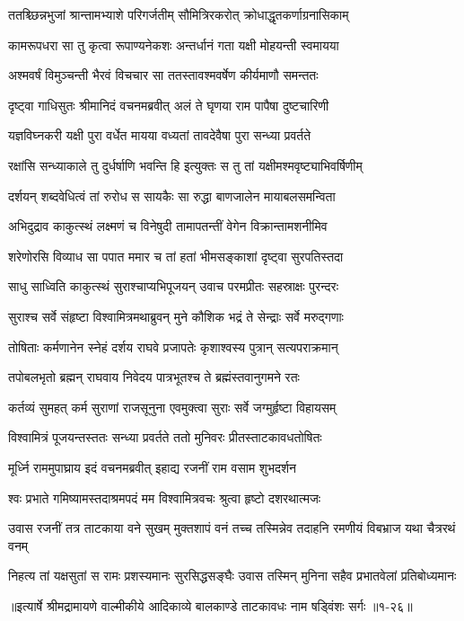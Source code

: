\twolineshloka
{ततश्च्छिन्नभुजां श्रान्तामभ्याशे परिगर्जतीम्}
{सौमित्रिरकरोत् क्रोधाद्धृतकर्णाग्रनासिकाम्} %

\twolineshloka
{कामरूपधरा सा तु कृत्वा रूपाण्यनेकशः}
{अन्तर्धानं गता यक्षी मोहयन्ती स्वमायया} %

\twolineshloka
{अश्मवर्षं विमुञ्चन्ती भैरवं विचचार सा}
{ततस्तावश्मवर्षेण कीर्यमाणौ समन्ततः} %

\twolineshloka
{दृष्ट्वा गाधिसुतः श्रीमानिदं वचनमब्रवीत्}
{अलं ते घृणया राम पापैषा दुष्टचारिणी} %

\twolineshloka
{यज्ञविघ्नकरी यक्षी पुरा वर्धेत मायया}
{वध्यतां तावदेवैषा पुरा सन्ध्या प्रवर्तते} %

\twolineshloka
{रक्षांसि सन्ध्याकाले तु दुर्धर्षाणि भवन्ति हि}
{इत्युक्तः स तु तां यक्षीमश्मवृष्ट्याभिवर्षिणीम्} %

\twolineshloka
{दर्शयन् शब्दवेधित्वं तां रुरोध स सायकैः}
{सा रुद्धा बाणजालेन मायाबलसमन्विता} %

\twolineshloka
{अभिदुद्राव काकुत्स्थं लक्ष्मणं च विनेषुदी}
{तामापतन्तीं वेगेन विक्रान्तामशनीमिव} %

\twolineshloka
{शरेणोरसि विव्याध सा पपात ममार च}
{तां हतां भीमसङ्काशां दृष्ट्वा सुरपतिस्तदा} %

\twolineshloka
{साधु साध्विति काकुत्स्थं सुराश्चाप्यभिपूजयन्}
{उवाच परमप्रीतः सहस्राक्षः पुरन्दरः} %

\twolineshloka
{सुराश्च सर्वे संहृष्टा विश्वामित्रमथाब्रुवन्}
{मुने कौशिक भद्रं ते सेन्द्राः सर्वे मरुद्गणाः} %

\twolineshloka
{तोषिताः कर्मणानेन स्नेहं दर्शय राघवे}
{प्रजापतेः कृशाश्वस्य पुत्रान् सत्यपराक्रमान्} %

\twolineshloka
{तपोबलभृतो ब्रह्मन् राघवाय निवेदय}
{पात्रभूतश्च ते ब्रह्मंस्तवानुगमने रतः} %

\twolineshloka
{कर्तव्यं सुमहत् कर्म सुराणां राजसूनुना}
{एवमुक्त्वा सुराः सर्वे जग्मुर्हृष्टा विहायसम्} %

\twolineshloka
{विश्वामित्रं पूजयन्तस्ततः सन्ध्या प्रवर्तते}
{ततो मुनिवरः प्रीतस्ताटकावधतोषितः} %

\twolineshloka
{मूर्ध्नि राममुपाघ्राय इदं वचनमब्रवीत्}
{इहाद्य रजनीं राम वसाम शुभदर्शन} %

\twolineshloka
{श्वः प्रभाते गमिष्यामस्तदाश्रमपदं मम}
{विश्वामित्रवचः श्रुत्वा हृष्टो दशरथात्मजः} %

\threelineshloka
{उवास रजनीं तत्र ताटकाया वने सुखम्}
{मुक्तशापं वनं तच्च तस्मिन्नेव तदाहनि}
{रमणीयं विबभ्राज यथा चैत्ररथं वनम्} %

\twolineshloka
{निहत्य तां यक्षसुतां स रामः प्रशस्यमानः सुरसिद्धसङ्घैः}
{उवास तस्मिन् मुनिना सहैव प्रभातवेलां प्रतिबोध्यमानः} %


॥इत्यार्षे श्रीमद्रामायणे वाल्मीकीये आदिकाव्ये बालकाण्डे ताटकावधः नाम षड्विंशः सर्गः ॥१-२६॥
